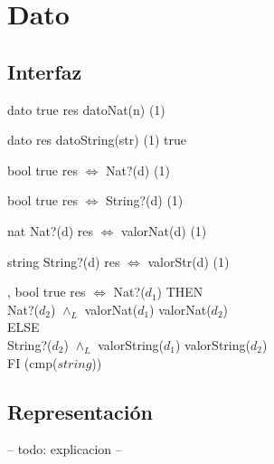 \section{Dato}

\subsection{Interfaz}

\iusa{}

\ioperaciones

{} %
{dato} %
{true} %
{res \igobs datoNat(n)} %
{\bigo(1)} %
{} %
{} %

{}
{dato}
{}
{res \igobs datoString(str)}
{\bigo(1)}
{true}
{}

{}
{bool}
{true}
{res $\iff$ Nat?(d)}
{\bigo(1)}
{}
{}

{}
{bool}
{true}
{res $\iff$ String?(d)}
{\bigo(1)}
{}
{}

{}
{nat}
{Nat?(d)}
{res $\iff$ valorNat(d)}
{\bigo(1)}
{}
{}

{}
{string}
{String?(d)}
{res $\iff$ valorStr(d)}
{\bigo(1)}
{}
{}

\operacion{$\bullet == \bullet$}
{, }
{bool}
{true}
{res $\iff$ \IFL Nat?($d_1$) THEN \\
    \hspace*{10.5em} Nat?($d_2$) $\land_L$ valorNat($d_1$) \igobs valorNat($d_2$) \\
    \hspace*{9em} ELSE \\
    \hspace*{10.5em} String?($d_2$) $\land_L$ valorString($d_1$) \igobs valorString($d_2$) \\
    \hspace*{9em} FI }
{\bigo(cmp($string$))}
{}
{}

\subsection{Representación}

-- todo: explicacion --


